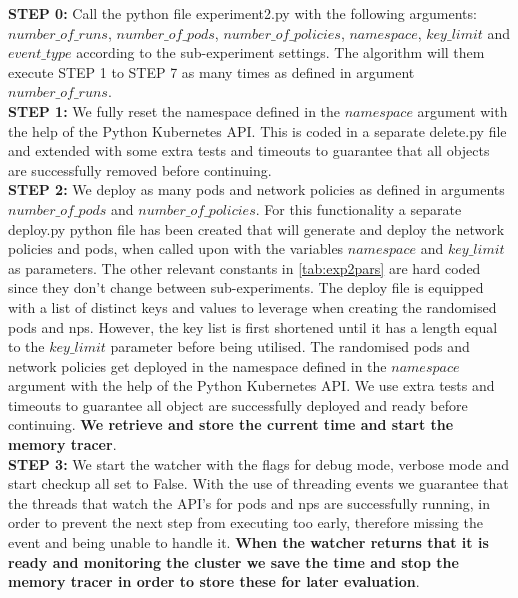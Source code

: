 \textbf{STEP 0:} Call the python file experiment2.py with the following arguments: $number\_of\_runs$, $number\_of\_pods$, $number\_of\_policies$, $namespace$, $key\_limit$ and $event\_type$ according to the sub-experiment settings. The algorithm will them execute STEP 1 to STEP 7 as many times as defined in argument $number\_of\_runs$.
\\[10pt]

\textbf{STEP 1:} We fully reset the namespace defined in the $namespace$ argument with the help of the Python Kubernetes API. This is coded in a separate delete.py file and extended with some extra tests and timeouts to guarantee that all objects are successfully removed before continuing.
\\[10pt]

\textbf{STEP 2:} We deploy as many pods and network policies as defined in arguments \newline $number\_of\_pods$ and $number\_of\_policies$. For this functionality a separate deploy.py python file has been created that will generate and deploy the network policies and pods, when called upon with the variables $namespace$ and $key\_limit$ as parameters. The other relevant constants in \autoref{tab:exp2pars} are hard coded since they don't change between sub-experiments. The deploy file is equipped with a list of distinct keys and values to leverage when creating the randomised pods and \acrshort{np}s. However, the key list is first shortened until it has a length equal to the $key\_limit$ parameter before being utilised. The randomised pods and network policies get deployed in the namespace defined in the $namespace$ argument with the help of the Python Kubernetes API. We use extra tests and timeouts to guarantee all object are successfully deployed and ready before continuing. 
\textbf{We retrieve and store the current time and start the memory tracer}.
\\[10pt]

\textbf{STEP 3:} We start the watcher with the flags for debug mode, verbose mode and start checkup all set to False. With the use of threading events we guarantee that the threads that watch the API's for pods and \acrshort{np}s are successfully running, in order to prevent the next step from executing too early, therefore missing the event and being unable to handle it. \textbf{When the watcher returns that it is ready and monitoring the cluster we save the time and stop the memory tracer in order to store these for later evaluation}.
\\[10pt]

